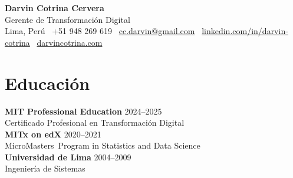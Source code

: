 \documentclass[10pt,letterpaper]{article}
\begin{document}
\begin{center}
  {\LARGE\bfseries Darvin Cotrina Cervera}\\[2pt]
  {\small Gerente de Transformación Digital}\\[3pt]
  {\small Lima, Perú \textbar\ +51 948 269 619 \textbar\ \href{mailto:cc.darvin@gmail.com}{cc.darvin@gmail.com} \textbar\ \href{https://www.linkedin.com/in/darvin-cotrina}{linkedin.com/in/darvin-cotrina} \textbar\ \href{https://www.darvincotrina.com}{darvincotrina.com}}
\end{center}
\vspace{-8pt}

\section{Educación}
\textbf{MIT Professional Education} \hfill 2024--2025\\
Certificado Profesional en Transformación Digital\\[1pt]
\textbf{MITx on edX} \hfill 2020--2021\\
MicroMasters\textregistered\ Program in Statistics and Data Science\\[1pt]
\textbf{Universidad de Lima} \hfill 2004--2009\\
Ingeniería de Sistemas

\end{document}
